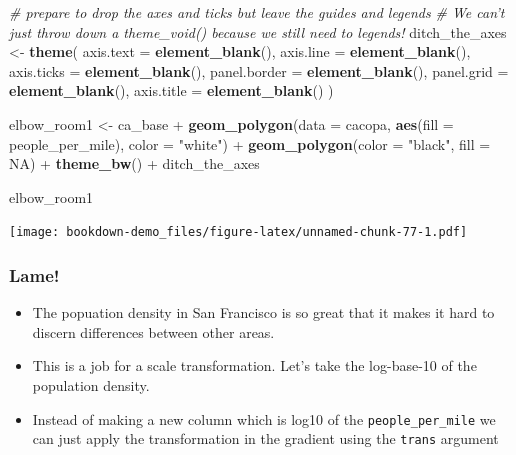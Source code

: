 \documentclass[]{book}
\newenvironment{Shaded}{\begin{snugshade}}{\end{snugshade}}
\newcommand{\KeywordTok}[1]{\textcolor[rgb]{0.13,0.29,0.53}{\textbf{{#1}}}}
\newcommand{\DataTypeTok}[1]{\textcolor[rgb]{0.13,0.29,0.53}{{#1}}}
\newcommand{\StringTok}[1]{\textcolor[rgb]{0.31,0.60,0.02}{{#1}}}
\newcommand{\CommentTok}[1]{\textcolor[rgb]{0.56,0.35,0.01}{\textit{{#1}}}}
\newcommand{\OtherTok}[1]{\textcolor[rgb]{0.56,0.35,0.01}{{#1}}}
\newcommand{\NormalTok}[1]{{#1}}
\providecommand{\tightlist}{%
  \setlength{\itemsep}{0pt}\setlength{\parskip}{0pt}}
\theoremstyle{definition}
\theoremstyle{definition}
\theoremstyle{remark}
\begin{document}
\begin{Shaded}
\begin{Highlighting}[]
\CommentTok{# prepare to drop the axes and ticks but leave the guides and legends}
\CommentTok{# We can't just throw down a theme_void() because we still need to legends!}
\NormalTok{ditch_the_axes <-}\StringTok{ }\KeywordTok{theme}\NormalTok{(}
  \DataTypeTok{axis.text =} \KeywordTok{element_blank}\NormalTok{(),}
  \DataTypeTok{axis.line =} \KeywordTok{element_blank}\NormalTok{(),}
  \DataTypeTok{axis.ticks =} \KeywordTok{element_blank}\NormalTok{(),}
  \DataTypeTok{panel.border =} \KeywordTok{element_blank}\NormalTok{(),}
  \DataTypeTok{panel.grid =} \KeywordTok{element_blank}\NormalTok{(),}
  \DataTypeTok{axis.title =} \KeywordTok{element_blank}\NormalTok{()}
  \NormalTok{)}

\NormalTok{elbow_room1 <-}\StringTok{ }\NormalTok{ca_base +}\StringTok{ }
\StringTok{      }\KeywordTok{geom_polygon}\NormalTok{(}\DataTypeTok{data =} \NormalTok{cacopa, }\KeywordTok{aes}\NormalTok{(}\DataTypeTok{fill =} \NormalTok{people_per_mile), }\DataTypeTok{color =} \StringTok{"white"}\NormalTok{) +}
\StringTok{      }\KeywordTok{geom_polygon}\NormalTok{(}\DataTypeTok{color =} \StringTok{"black"}\NormalTok{, }\DataTypeTok{fill =} \OtherTok{NA}\NormalTok{) +}
\StringTok{      }\KeywordTok{theme_bw}\NormalTok{() +}
\StringTok{      }\NormalTok{ditch_the_axes}

\NormalTok{elbow_room1 }
\end{Highlighting}
\end{Shaded}

\texttt{[image: bookdown-demo\_files/figure-latex/unnamed-chunk-77-1.pdf]}

\subsubsection{Lame!}\label{lame}

\begin{itemize}
\tightlist
\item
  The popuation density in San Francisco is so great that it makes it
  hard to discern differences between other areas.
\item
  This is a job for a scale transformation. Let's take the log-base-10
  of the population density.
\item
  Instead of making a new column which is log10 of the
  \texttt{people\_per\_mile} we can just apply the transformation in the
  gradient using the \texttt{trans} argument
\end{itemize}
\end{document}
